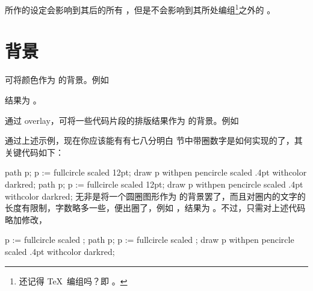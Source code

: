 \type{\setupframed} 所作的设定会影响到其后的所有 \type{\framed}，但是不会影响到其所处编组\footnote{还记得 \TeX\ 编组吗？即 。}之外的 \type{\framed}。

\section{背景}

可将颜色作为 \type{\framed} 的背景。例如

\starttyping[option=TEX]
\stoptyping

\noindent 结果为 。

通过 overlay，可将一些代码片段的排版结果作为 \type{\framed} 的背景。例如

\starttyping[option=TEX]
\stoptyping

\blank

通过上述示例，现在你应该能有有七八分明白  节中带圈数字是如何实现的了，其关键代码如下：

\starttyping[option=TEX]
  path p;
  p := fullcircle scaled 12pt;
  draw p withpen pencircle scaled .4pt
         withcolor darkred;
\stopuseMPgraphic
{}
\def\fooframe#1{%
  \inframed[frame=off,background=rsquare]{#1}%
}
\stoptyping
{}
  path p;
  p := fullcircle scaled 12pt;
  draw p withpen pencircle scaled .4pt
         withcolor darkred;
\stopuseMPgraphic
{}
\def\fooframe#1{%
  \inframed[frame=off,background=rsquare]{#1}%
}
\noindent 无非是将一个圆圈图形作为 \type{\inframed} 的背景罢了，而且对圈内的文字的长度有限制，字数略多一些，便出圈了，例如 \type{\fooframe{123}}，结果为 \fooframe{123}。不过，只需对上述代码略加修改，

\starttyping[option=TEX]
  p := fullcircle scaled \overlaywidth;
\stoptyping
{}
  path p;
  p := fullcircle scaled \overlaywidth;
  draw p withpen pencircle scaled .4pt
         withcolor darkred;
\stopuseMPgraphic
{}
\def\fooframe#1{%
  \inframed[frame=off,background=rsquare]{#1}%
}

